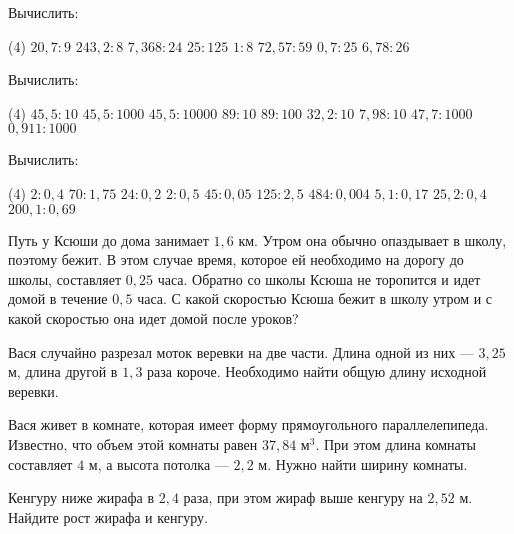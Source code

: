 \begin{consultation}
	\begin{listofex}
		\item Вычислить:
		\begin{tasks}(4)
			\task \( 20,7:9 \)
			\task \( 243,2:8 \)
			\task \( 7,368:24 \)
			\task \( 25:125 \)
			\task \( 1:8 \)
			\task \( 72,57:59 \)
			\task \( 0,7:25 \)
			\task \( 6,78:26 \)
		\end{tasks}
		\item Вычислить:
		\begin{tasks}(4)
			\task \( 45,5:10 \)
			\task \( 45,5:1000 \)
			\task \( 45,5:10000 \)
			\task \( 89:10 \)
			\task \( 89:100 \)
			\task \( 32,2:10 \)
			\task \( 7,98:10 \)
			\task \( 47,7:1000 \)
			\task \( 0,911:1000 \)
		\end{tasks}
		\item Вычислить:
		\begin{tasks}(4)
			\task \( 2:0,4 \)
			\task \( 70:1,75 \)
			\task \( 24:0,2 \)
			\task \( 2:0,5 \)
			\task \( 45:0,05 \)
			\task \( 125:2,5 \)
			\task \( 484:0,004 \)
			\task \( 5,1:0,17 \)
			\task \( 25,2:0,4 \)
			\task \( 200,1:0,69 \)
		\end{tasks}
		\item Путь у Ксюши до дома занимает \( 1,6 \) км. Утром она обычно опаздывает в школу, поэтому бежит. В этом случае время, которое ей необходимо на дорогу до школы, составляет \( 0,25 \) часа. Обратно со школы Ксюша не торопится и идет домой в течение \( 0,5 \) часа. С какой скоростью Ксюша бежит в школу утром и с какой скоростью она идет домой после уроков?
		\item Вася случайно разрезал моток веревки на две части. Длина одной из них --- \( 3,25 \) м, длина другой в \( 1,3 \) раза короче. Необходимо найти общую длину исходной веревки.
		\item Вася живет в комнате, которая имеет форму прямоугольного параллелепипеда. Известно, что объем этой комнаты равен \( 37,84 \) м\( ^3 \). При этом длина комнаты составляет \( 4 \) м, а высота потолка --- \( 2,2 \) м. Нужно найти ширину комнаты. 
		\item Кенгуру ниже жирафа в \( 2,4 \) раза, при этом жираф выше кенгуру на \( 2,52 \) м. Найдите рост жирафа и кенгуру.
	\end{listofex}
\end{consultation}

